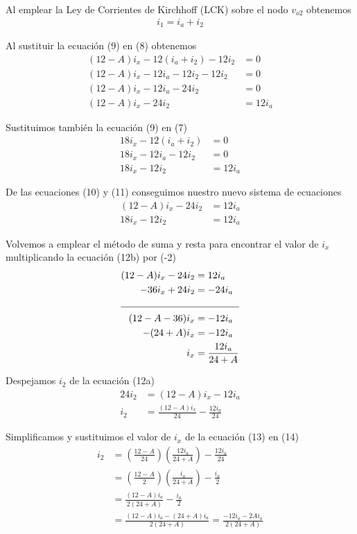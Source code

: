 \documentclass{article}
\begin{document}
	\noindent Al emplear la Ley de Corrientes de Kirchhoff (LCK) sobre el nodo $v_{o2}$ obtenemos
	\begin{align}
		i_1 = i_a + i_2
	\end{align}
	
	\noindent Al sustituir la ecuación (9) en (8) obtenemos
	\begin{align}
		(12-A)i_x - 12(i_a + i_2) - 12i_2 &= 0\nonumber\\
		(12-A)i_x - 12i_a - 12i_2 - 12i_2 &= 0\nonumber\\
		(12-A)i_x - 12i_a - 24i_2 &= 0\nonumber\\
		(12-A)i_x - 24i_2 &= 12i_a
	\end{align}
	
	\noindent Sustituimos también la ecuación (9) en (7)
	\begin{align}
		18i_x - 12(i_a + i_2) &= 0\nonumber\\
		18i_x - 12i_a - 12i_2 &= 0\nonumber\\
		18i_x - 12i_2 &= 12i_a
	\end{align}
	
	\noindent De las ecuaciones (10) y (11) conseguimos nuestro nuevo sistema de ecuaciones
	\begin{subequations}
		\begin{align}
			(12-A)i_x - 24i_2 &= 12i_a\\
			18i_x - 12i_2 &= 12i_a
		\end{align}	
	\end{subequations}
	
	\noindent Volvemos a emplear el método de suma y resta para encontrar el valor de $i_x$ multiplicando la ecuación (12b) por (-2)
	\begin{align}
		(12-A)i_x - 24i_2 &= 12i_a\nonumber\\
		-36i_x + 24i_2 &= -24i_a\nonumber \\
		\cline{1-2}
		(12-A-36)i_x  &= -12i_a\nonumber\\
		-(24+A)i_x &= -12i_a\nonumber\\
		i_x &= \frac{12i_a}{24+A} 
	\end{align}
	
	\noindent Despejamos $i_2$ de la ecuación (12a)
	\begin{align}
		24i_2 &= (12-A)i_x - 12i_a\nonumber\\
		i_2 &= \frac{(12-A)i_x}{24} - \frac{12i_a}{24}
	\end{align}
	
	\noindent Simplificamos y sustituimos el valor de $i_x$ de la ecuación (13) en (14)
	\begin{align}
		i_2 &= \left( \frac{12-A}{24} \right) \left( \frac{12i_a}{24+A} \right) - \frac{12i_a}{24}\nonumber\\
		 &= \left( \frac{12-A}{2} \right) \left( \frac{i_a}{24+A} \right) - \frac{i_a}{2}\nonumber\\
		&= \frac{(12-A)i_a}{2(24+A)} - \frac{i_a}{2}\nonumber\\
		&= \frac{(12-A)i_a - (24 + A)i_a}{2(24+A)} = \frac{-12i_a - 2Ai_a}{2(24+A)}\nonumber
	\end{align}
	
\end{document}
